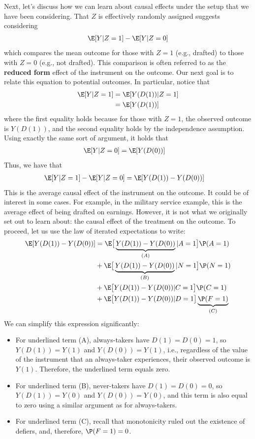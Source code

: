 \documentclass[
  letterpaper,
  DIV=11,
  numbers=noendperiod]{scrreprt}
\begin{document}
Next, let's discuss how we can learn about causal effects under the
setup that we have been considering. That \(Z\) is effectively randomly
assigned suggests considering \begin{align*}
  \E[Y | Z=1] - \E[Y | Z=0]
\end{align*} which compares the mean outcome for those with \(Z=1\)
(e.g., drafted) to those with \(Z=0\) (e.g., not drafted). This
comparison is often referred to as the \textbf{reduced form} effect of
the instrument on the outcome. Our next goal is to relate this equation
to potential outcomes. In particular, notice that \begin{align*}
  \E[Y | Z=1] &= \E[Y(D(1)) | Z=1] \\
  &= \E[Y(D(1))]
\end{align*} where the first equality holds because for those with
\(Z=1\), the observed outcome is \(Y(D(1))\), and the second equality
holds by the independence assumption. Using exactly the same sort of
argument, it holds that \begin{align*}
  \E[Y | Z=0] &= \E[Y(D(0))]
\end{align*} Thus, we have that \begin{align*}
  \E[Y | Z=1] - \E[Y | Z=0] &= \E[Y(D(1)) - Y(D(0))]
\end{align*} This is the average causal effect of the instrument on the
outcome. It could be of interest in some cases. For example, in the
military service example, this is the average effect of being drafted on
earnings. However, it is not what we originally set out to learn about:
the causal effect of the treatment on the outcome. To proceed, let us
use the law of iterated expectations to write: \begin{align*}
  \E[Y(D(1)) - Y(D(0))] &= \E\big[\underbrace{Y(D(1)) - Y(D(0))}_{(A)} | A=1\big] \P(A=1) \\
  &+ \E\big[\underbrace{Y(D(1)) - Y(D(0))}_{(B)} | N=1\big] \P(N=1) \\
  &+ \E\big[Y(D(1)) - Y(D(0)) | C=1\big] \P(C=1) \\
  &+ \E\big[Y(D(1)) - Y(D(0)) | D=1\big] \underbrace{\P(F=1)}_{(C)}
\end{align*} We can simplify this expression significantly:

\begin{itemize}
\item
  For underlined term (A), always-takers have \(D(1)=D(0)=1\), so
  \(Y(D(1)) = Y(1)\) and \(Y(D(0)) = Y(1)\), i.e., regardless of the
  value of the instrument that an always-taker experiences, their
  observed outcome is \(Y(1)\). Therefore, the underlined term equals
  zero.
\item
  For underlined term (B), never-takers have \(D(1)=D(0)=0\), so
  \(Y(D(1)) = Y(0)\) and \(Y(D(0)) = Y(0)\), and this term is also equal
  to zero using a similar argument as for always-takers.
\item
  For underlined term (C), recall that monotonicity ruled out the
  existence of defiers, and, therefore, \(\P(F=1) = 0\).
\end{itemize}
\end{document}
